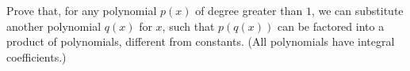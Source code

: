 Prove that, for any polynomial $p(x)$ of degree greater than $1$, we can substitute another polynomial $q(x)$ for $x$, such that $p(q(x))$ can be factored into a product of polynomials, different from constants. (All polynomials have integral coefficients.)
